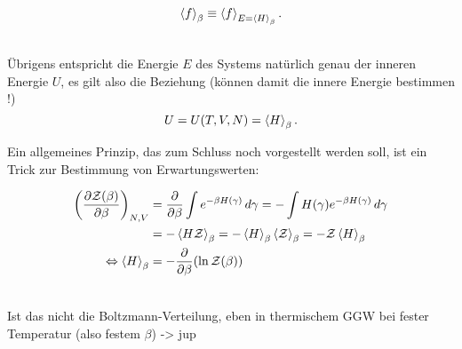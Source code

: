 \begin{equation}\label{key}
\expval{f}_\beta \equiv \expval{f}_{E = \expval{H}_\beta} .
\end{equation}


	\\

Übrigens entspricht die Energie $E$ des Systems natürlich genau der inneren Energie $U$, es gilt also die Beziehung (können damit die innere Energie bestimmen !)
\begin{equation}\label{key}
U = U(T, V, N) = \expval{H}_\beta .
\end{equation}

Ein allgemeines Prinzip, das zum Schluss noch vorgestellt werden soll, ist ein Trick zur Bestimmung von Erwartungswerten:

\begin{align}
\qty(\pdv{\mathcal{Z}(\beta)}{\beta})_{N,V} &= \pdv{\beta} \int e^{-\beta H(\gamma)} \, d\gamma = - \int H(\gamma) e^{-\beta H(\gamma)} \, d\gamma
\notag\\
&= - \expval{H \mathcal{Z}}_\beta = - \expval{H}_\beta \expval{\mathcal{Z}}_\beta = - \mathcal{Z} \expval{H}_\beta
\notag\\
\Leftrightarrow \expval{H}_\beta &= -\pdv{\beta}\qty(\ln \mathcal{Z}(\beta)) \label{eq:evalH}
\end{align}

	\\


Ist das nicht die Boltzmann-Verteilung, eben in thermischem GGW bei fester Temperatur (also festem $\beta$) -> jup

